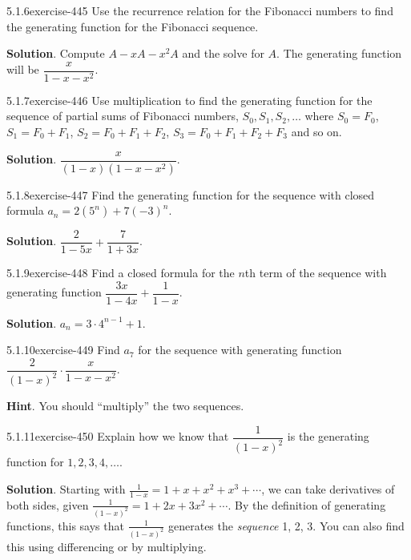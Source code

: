 \documentclass[twoside,11pt,]{book}
\numberwithin{equation}{chapter}
\begin{document}
\begin{divisionsolution}{5.1.6}{}{exercise-445}%
\hypertarget{p-5104}{}%
Use the recurrence relation for the Fibonacci numbers to find the generating function for the Fibonacci sequence.%
\par\smallskip%
\noindent\textbf{Solution}.\quad%
\hypertarget{p-5105}{}%
Compute \(A - xA - x^2A\) and the solve for \(A\). The generating function will be \(\dfrac{x}{1-x-x^2}\).%
\end{divisionsolution}%
\begin{divisionsolution}{5.1.7}{}{exercise-446}%
\hypertarget{p-5106}{}%
Use multiplication to find the generating function for the sequence of partial sums of Fibonacci numbers, \(S_0, S_1, S_2, \ldots\) where \(S_0 = F_0\), \(S_1 = F_0 + F_1\), \(S_2 = F_0 + F_1 + F_2\), \(S_3 = F_0 + F_1 + F_2 + F_3\) and so on.%
\par\smallskip%
\noindent\textbf{Solution}.\quad%
\hypertarget{p-5107}{}%
\(\dfrac{x}{(1-x)(1-x-x^2)}\).%
\end{divisionsolution}%
\begin{divisionsolution}{5.1.8}{}{exercise-447}%
\hypertarget{p-5108}{}%
Find the generating function for the sequence with closed formula \(a_n = 2(5^n) + 7(-3)^n\).%
\par\smallskip%
\noindent\textbf{Solution}.\quad%
\hypertarget{p-5109}{}%
\(\dfrac{2}{1-5x} + \dfrac{7}{1+3x}\).%
\end{divisionsolution}%
\begin{divisionsolution}{5.1.9}{}{exercise-448}%
\hypertarget{p-5110}{}%
Find a closed formula for the \(n\)th term of the sequence with generating function \(\dfrac{3x}{1-4x} + \dfrac{1}{1-x}\).%
\par\smallskip%
\noindent\textbf{Solution}.\quad%
\hypertarget{p-5111}{}%
\(a_n = 3\cdot 4^{n-1} + 1\).%
\end{divisionsolution}%
\begin{divisionsolution}{5.1.10}{}{exercise-449}%
\hypertarget{p-5112}{}%
Find \(a_7\) for the sequence with generating function \(\dfrac{2}{(1-x)^2}\cdot\dfrac{x}{1-x-x^2}\).%
\par\smallskip%
\noindent\textbf{Hint}.\quad%
\hypertarget{p-5113}{}%
You should ``multiply'' the two sequences.%
\end{divisionsolution}%
\begin{divisionsolution}{5.1.11}{}{exercise-450}%
\hypertarget{p-5114}{}%
Explain how we know that \(\dfrac{1}{(1-x)^2}\) is the generating function for \(1, 2, 3, 4, \ldots\).%
\par\smallskip%
\noindent\textbf{Solution}.\quad%
\hypertarget{p-5115}{}%
Starting with \(\frac{1}{1-x} = 1 + x + x^2 + x^3 +\cdots\), we can take derivatives of both sides, given \(\frac{1}{(1-x)^2} = 1 + 2x + 3x^2 + \cdots\). By the definition of generating functions, this says that \(\frac{1}{(1-x)^2}\) generates the \emph{sequence} 1, 2, 3\textellipsis{}. You can also find this using differencing or by multiplying.%
\end{divisionsolution}%
\end{document}
